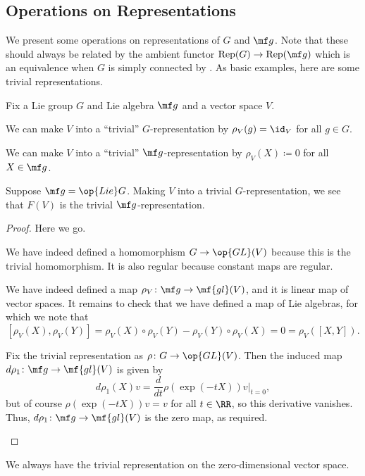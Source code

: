 \documentclass[../notes.tex]{subfiles}
\begin{document}
\subsection{Operations on Representations}
We present some operations on representations of $G$ and $\mf g$. Note that these should always be related by the ambient functor $\mathrm{Rep}(G)\to\mathrm{Rep}(\mf g)$ which is an equivalence when $G$ is simply connected by . As basic examples, here are some trivial representations.
\begin{lemma}
	Fix a Lie group $G$ and Lie algebra $\mf g$ and a vector space $V$.
	\begin{listalph}
		\item We can make $V$ into a ``trivial'' $G$-representation by $\rho_V(g)=\id_V$ for all $g\in G$.
		\item We can make $V$ into a ``trivial'' $\mf g$-representation by $\rho_V(X)\coloneqq0$ for all $X\in\mf g$.
		\item Suppose $\mf g=\op{Lie}G$. Making $V$ into a trivial $G$-representation, we see that $F(V)$ is the trivial $\mf g$-representation.
	\end{listalph}
\end{lemma}
\begin{proof}
	Here we go.
	\begin{listalph}
		\item We have indeed defined a homomorphism $G\to\op{GL}(V)$ because this is the trivial homomorphism. It is also regular because constant maps are regular.
		\item We have indeed defined a map $\rho_V\colon\mf g\to\mf{gl}(V)$, and it is linear map of vector spaces. It remains to check that we have defined a map of Lie algebras, for which we note that
		\[[\rho_V(X),\rho_V(Y)]=\rho_V(X)\circ\rho_V(Y)-\rho_V(Y)\circ\rho_V(X)=0=\rho_V([X,Y]).\]
		\item Fix the trivial representation as $\rho\colon G\to\op{GL}(V)$. Then the induced map $d\rho_1\colon\mf g\to\mf{gl}(V)$ is given by
		\[d\rho_1(X)v=\frac d{dt}\rho(\exp(-tX))v\bigg|_{t=0},\]
		but of course $\rho(\exp(-tX))v=v$ for all $t\in\RR$, so this derivative vanishes. Thus, $d\rho_1\colon\mf g\to\mf{gl}(V)$ is the zero map, as required.
		\qedhere
	\end{listalph}
\end{proof}
\begin{example}
	We always have the trivial representation on the zero-dimensional vector space.
\end{example}
\end{document}
